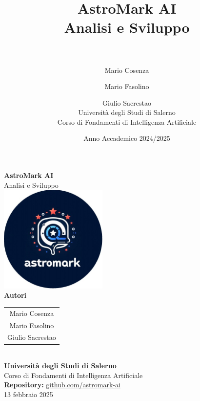 \documentclass[a4paper,12pt]{report}
\title{%
  \textbf{AstroMark AI}\\[0.5cm]
  \large Analisi e Sviluppo\\[0.5cm]

  \\
}
\author{%
  Mario Cosenza \and
  Mario Fasolino \and
  Giulio Sacrestao\\[0.5cm]
  Università degli Studi di Salerno\\
  Corso di Fondamenti di Intelligenza Artificiale%
}
\date{Anno Accademico 2024/2025}
\begin{document}
\begin{titlepage}
    \centering
    \vspace*{1.5cm}

    {\Huge \textbf{AstroMark AI}}\\[1cm]
    {\Large {Analisi e Sviluppo}}\\[2cm]

    \includegraphics[width=0.4\textwidth]{images/astromarkLogo.jpg}\\[2.0cm]

    {\LARGE \textbf{Autori}}\\[0.5cm]
    \begin{tabular}{c}
        {\Large {Mario Cosenza}} \\[0.3cm]
        {\Large {Mario Fasolino}} \\[0.3cm]
        {\Large {Giulio Sacrestao}}
    \end{tabular}\\[1.5cm]

    {\large \textbf{Università degli Studi di Salerno}}\\[0.3cm]
    {\large Corso di Fondamenti di Intelligenza Artificiale}\\[0.3cm]

    {\large \textbf{Repository:} \href{https://github.com/mariocosenza/astromark-ai}{\faGithub\;github.com/astromark-ai}}\\[2cm]

    {\large 13 febbraio 2025}

    \vfill
\end{titlepage}
\newpage

\pagestyle{fancy}
\fancyhf{}
\fancyfoot[C]{\thepage}

\tableofcontents
\newpage











\appendix

\end{document}
